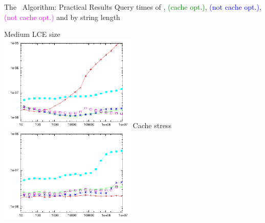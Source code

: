 \documentclass{beamer}
\begin{document}
\begin{frame}{The \fprintk\ Algorithm: Practical Results}
    Query times of
    \textcolor{red}{},
    \textcolor{green}{\fprint[2] (cache opt.)},
    \textcolor{blue}{\fprint[3] (not cache opt.)},
    \textcolor{magenta}{\fprint[\logceil] (not cache opt.)} and
    \textcolor{cyan}{}
    by string length
    \begin{multicols}{2}{
        \begin{center}
            Medium LCE size\\
            \includegraphics[width=0.49\textwidth,type=pdf,ext=.pdf,read=.pdf]{../src/results/length-slides-cache-repeat-pow.plt}
            \newpage
            Cache stress\\
            \includegraphics[width=0.49\textwidth,type=pdf,ext=.pdf,read=.pdf]{../src/results/length-slides-cache-rand2.plt}
        \end{center}
    }
    \end{multicols}
\end {frame}
\end{document}
